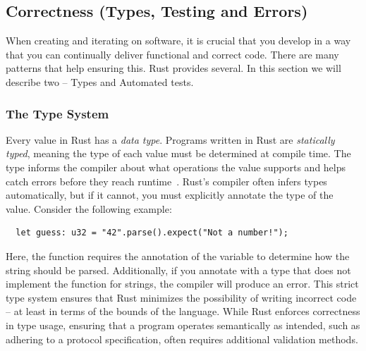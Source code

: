 \documentclass[twoside,11pt]{report}
\theoremstyle{definition}
\theoremstyle{plain}
\begin{document}
\subsection{Correctness (Types, Testing and Errors)}
When creating and iterating on software, it is crucial that you develop in a way that you can continually deliver functional and correct code. There are many patterns that help ensuring this. Rust provides several. In this section we will describe two -- Types and Automated tests.

\subsubsection{The Type System}\label{sec:rusttypes}
Every value in Rust has a \textit{data type}. Programs written in Rust are \textit{statically typed}, meaning the type of each value must be determined at compile time. The type informs the compiler about what operations the value supports and helps catch errors before they reach runtime~\cite[ch.3.2]{rustlangRustProgramming}. Rust's compiler often infers types automatically, but if it cannot, you must explicitly annotate the type of the value. Consider the following example:

\begin{verbatim} 
  let guess: u32 = "42".parse().expect("Not a number!"); 
\end{verbatim}

Here, the  function requires the annotation of the variable  to determine how the string should be parsed. Additionally, if you annotate  with a type that does not implement the  function for strings, the compiler will produce an error. This strict type system ensures that Rust minimizes the possibility of writing incorrect code -- at least in terms of the bounds of the language. While Rust enforces correctness in type usage, ensuring that a program operates semantically as intended, such as adhering to a protocol specification, often requires additional validation methods.
\end{document}

